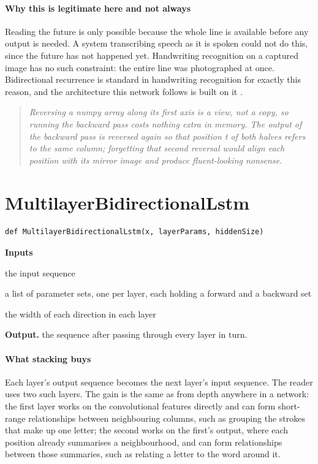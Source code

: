\paragraph{Why this is legitimate here and not always}
Reading the future is only possible because the whole line is available before any output is needed. A system transcribing speech as it is spoken could not do this, since the future has not happened yet. Handwriting recognition on a captured image has no such constraint: the entire line was photographed at once. Bidirectional recurrence is standard in handwriting recognition for exactly this reason, and the architecture this network follows is built on it \cite{shi2017}.


\begin{quote}\small\itshape Reversing a numpy array along its first axis is a view, not a copy, so running the backward pass costs nothing extra in memory. The output of the backward pass is reversed again so that position t of both halves refers to the same column; forgetting that second reversal would align each position with its mirror image and produce fluent-looking nonsense.\end{quote}

\section{MultilayerBidirectionalLstm}
\begin{lstlisting}[style=sig]
def MultilayerBidirectionalLstm(x, layerParams, hiddenSize)
\end{lstlisting}

\noindent\textbf{Inputs}
\begin{description}[leftmargin=2.2em,style=nextline,font=\normalfont\ttfamily]\setlength\itemsep{1pt}
  \item[{x}] \normalfont the input sequence
  \item[{layerParams}] \normalfont a list of parameter sets, one per layer, each holding a forward and a backward set
  \item[{hiddenSize}] \normalfont the width of each direction in each layer
\end{description}

\noindent\textbf{Output.} the sequence after passing through every layer in turn.


\paragraph{What stacking buys}
Each layer's output sequence becomes the next layer's input sequence. The reader uses two such layers. The gain is the same as from depth anywhere in a network: the first layer works on the convolutional features directly and can form short-range relationships between neighbouring columns, such as grouping the strokes that make up one letter; the second works on the first's output, where each position already summarises a neighbourhood, and can form relationships between those summaries, such as relating a letter to the word around it.


